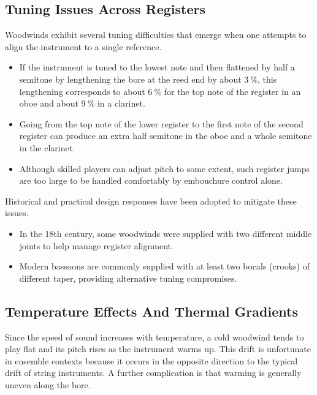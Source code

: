\subsection{Tuning Issues Across Registers}

Woodwinds exhibit several tuning difficulties that emerge when one attempts to align the instrument to a single reference. 

\begin{itemize}
    \item If the instrument is tuned to the lowest note and then flattened by half a semitone by lengthening the bore at the reed end by about \( \SI{3}{\percent} \), this lengthening corresponds to about \( \SI{6}{\percent} \) for the top note of the register in an oboe and about \( \SI{9}{\percent} \) in a clarinet.
    \item Going from the top note of the lower register to the first note of the second register can produce an extra half semitone in the oboe and a whole semitone in the clarinet. 
    \item Although skilled players can adjust pitch to some extent, such register jumps are too large to be handled comfortably by embouchure control alone.
\end{itemize}

Historical and practical design responses have been adopted to mitigate these issues. 

\begin{itemize}
    \item In the 18th century, some woodwinds were supplied with two different middle joints to help manage register alignment. 
    \item Modern bassoons are commonly supplied with at least two bocals (crooks) of different taper, providing alternative tuning compromises.
\end{itemize}

\subsection{Temperature Effects And Thermal Gradients}

Since the speed of sound increases with temperature, a cold woodwind tends to play flat and its pitch rises as the instrument warms up. This drift is unfortunate in ensemble contexts because it occurs in the opposite direction to the typical drift of string instruments. A further complication is that warming is generally uneven along the bore. 

